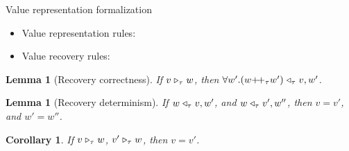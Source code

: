 \documentclass{beamer}
\newtheorem{lem}[thm]{Lemma}
\newtheorem{cor}[thm]{Corollary}
\begin{document}
\begin{frame}{Value representation formalization}
\begin{itemize}
	\item Value representation rules:
	\item Value recovery rules:
\end{itemize}

\begin{lem}[Recovery correctness]
	If $v \mathrel{\triangleright_{\tau}} w$, then $\forall w'.\Vtransb{(w {\++}_{\tau} w')}{\tau}{v}{w'}$. 
\end{lem}


\begin{lem}[Recovery determinism] 
	If $w \mathrel{\triangleleft_{\tau}} v,w'$, and $w \mathrel{\triangleleft_{\tau}} v',w''$,
	then $v = v'$, and $w' = w'' $.
\end{lem}


\begin{cor}
	If $v \mathrel{\triangleright_{\tau}} w$, $v' \mathrel{\triangleright_{\tau}} w$,
	then $v=v'$.
\end{cor}

\end{frame}
 
\end{document}
